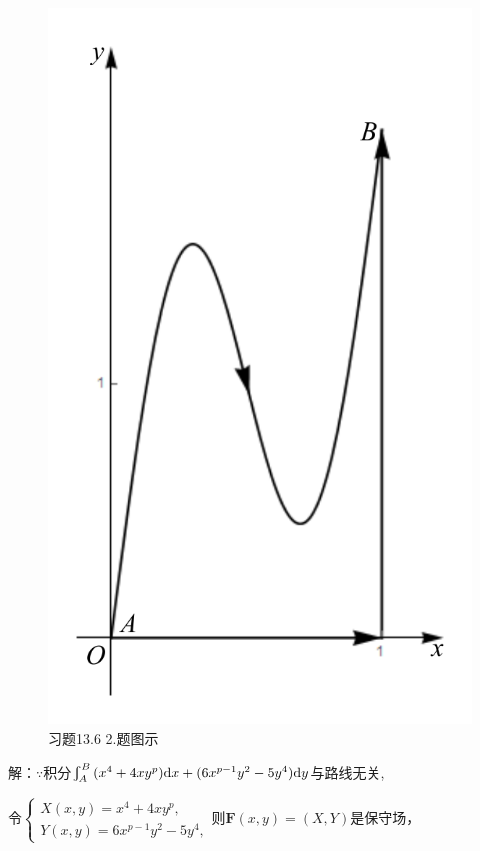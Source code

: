 \documentclass[12pt,UTF8,fleqn]{ctexart}
\newcommand{\md}[1]{\mathrm d#1}
\begin{document}
\begin{enumerate}
\begin{figure}[H]
\begin{center}
\includegraphics[height=0.5\textheight]{Figures25/Fig13-6-2.pdf}
\end{center}
\caption{习题13.6 2.题图示}
\label{13-6-2}
\end{figure}

解：$\because$积分$\varint_A^B{(x^4+4xy^p)\md x+(6x^{p-1}y^2-5y^4)\md y}$与路线无关,

令$\begin{cases}
X(x,y)=x^4+4xy^p,\\
Y(x,y)=6x^{p-1}y^2-5y^4,
\end{cases}$则$\bm F(x,y)=(X,Y)$是保守场，


\end{enumerate}
\end{document}
